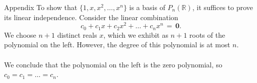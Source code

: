 \documentclass[handout]{beamer}
\begin{document}
        \begin{frame}{Appendix}
                To show that $\{1, x, x^2, \dots, x^n\}$ is a basis of $P_n(\mathbb{R})$, it suffices to prove its linear independence.
                Consider the linear combination
                \[
                        c_0 + c_1x + c_2x^2 + \dots + c_nx^n \,=\, \mathbf{0}.
                \]
                \pause
                We choose $n + 1$ distinct reals $x$, which we exhibit as $n + 1$ roots of the polynomial on the left.
                However, the degree of this polynomial is at most $n$. \\~\\

                We conclude that the polynomial on the left is the zero polynomial, so $c_0 = c_1 = \dots = c_n$.
        \end{frame}
\end{document}
